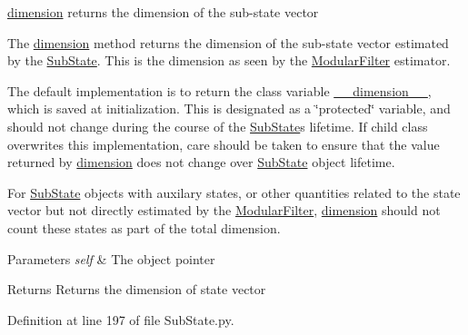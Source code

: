 \hyperlink{classmodest_1_1substates_1_1SubState_1_1SubState_aaf7473d2ebcd61adf1b7bb2262eb31d1}{dimension} returns the dimension of the sub-\/state vector 

The \hyperlink{classmodest_1_1substates_1_1SubState_1_1SubState_aaf7473d2ebcd61adf1b7bb2262eb31d1}{dimension} method returns the dimension of the sub-\/state vector estimated by the \hyperlink{classmodest_1_1substates_1_1SubState_1_1SubState}{Sub\+State}. This is the dimension as seen by the \hyperlink{namespacemodest_1_1ModularFilter}{Modular\+Filter} estimator.

The default implementation is to return the class variable \hyperlink{classmodest_1_1substates_1_1SubState_1_1SubState_af31a4993c39daa7aa34ef3312d41df34}{\+\_\+\+\_\+dimension\+\_\+\+\_\+}, which is saved at initialization. This is designated as a \char`\"{}protected\char`\"{} variable, and should not change during the course of the \hyperlink{classmodest_1_1substates_1_1SubState_1_1SubState}{Sub\+State}\textquotesingle{}s lifetime. If child class overwrites this implementation, care should be taken to ensure that the value returned by \hyperlink{classmodest_1_1substates_1_1SubState_1_1SubState_aaf7473d2ebcd61adf1b7bb2262eb31d1}{dimension} does not change over \hyperlink{classmodest_1_1substates_1_1SubState_1_1SubState}{Sub\+State} object lifetime.

For \hyperlink{classmodest_1_1substates_1_1SubState_1_1SubState}{Sub\+State} objects with auxilary states, or other quantities related to the state vector but not directly estimated by the \hyperlink{namespacemodest_1_1ModularFilter}{Modular\+Filter}, \hyperlink{classmodest_1_1substates_1_1SubState_1_1SubState_aaf7473d2ebcd61adf1b7bb2262eb31d1}{dimension} should not count these states as part of the total dimension.


\begin{DoxyParams}{Parameters}
{\em self} & The object pointer\\
\hline
\end{DoxyParams}
\begin{DoxyReturn}{Returns}
Returns the dimension of state vector 
\end{DoxyReturn}


Definition at line 197 of file Sub\+State.\+py.

